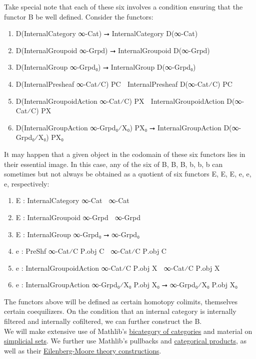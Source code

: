 \documentclass{book}
\theoremstyle{definition}
\begin{document}
Take special note that each of these six involves a condition ensuring that the functor B⃗ be well defined. Consider the functors:

\begin{enumerate}
\item D(InternalCategory ∞-Cat) ⭢ InternalCategory D(∞-Cat)
\item D(InternalGroupoid ∞-Grpd) ⭢ InternalGroupoid D(∞-Grpd)
\item D(InternalGroup ∞-Grpd₀) ⭢ InternalGroup D(∞-Grpd₀)
\item D(InternalPresheaf ∞-Cat⁄C) P⃗C ⭢ InternalPresheaf D(∞-Cat⁄C) P⃗C
\item D(InternalGroupoidAction ∞-Cat⁄C) P⃡X ⭢ InternalGroupoidAction D(∞-Cat⁄C) P⃡X
\item D(InternalGroupAction ∞-Grpd₀⁄X₀) PX₀ ⭢ InternalGroupAction D(∞-Grpd₀⁄X₀) PX₀
\end{enumerate}

It may happen that a given object in the codomain of these six functors lies in their essential image. In this case, any of the six of B⃗, B⃡, B, b⃗, b⃡, b can sometimes but not always be obtained as a quotient of six functors E⃗, E⃡, E, e⃗, e⃡, e, respectively:

\begin{enumerate}
\item E⃗ : InternalCategory ∞-Cat ⭢ ∞-Cat
\item E⃡ : InternalGroupoid ∞-Grpd ⭢ ∞-Grpd
\item E : InternalGroup ∞-Grpd₀ ⭢ ∞-Grpd₀
\item e⃗ : PreShf ∞-Cat⁄C P⃗.obj C ⭢ ∞-Cat⁄C P⃗.obj C
\item e⃡ : InternalGroupoidAction ∞-Cat⁄C P⃡.obj X ⭢ ∞-Cat⁄C P⃡.obj X
\item e : InternalGroupAction ∞-Grpd₀⁄X₀ P.obj X₀ ⭢ ∞-Grpd₀⁄X₀ P.obj X₀
\end{enumerate}

The functors above will be defined as certain homotopy colimits, themselves certain coequilizers. On the condition that an internal category is internally filtered and internally cofiltered, we can further construct the B⃗.\\

We will make extensive use of Mathlib's \href{https://leanprover-community.github.io/mathlib4_docs/Mathlib/CategoryTheory/Category/Cat.html#CategoryTheory.Cat.bicategory}{bicategory of categories} and material on \href{https://github.com/leanprover-community/mathlib4/blob/bd3e369b6f82c874de0f318c71d7e0595f8a3aa4//Mathlib/AlgebraicTopology/SimplicialSet.lean#L47-L48}{simplicial sets}. We further use Mathlib's pullbacks and \href{https://github.com/leanprover-community/mathlib4/blob/bd3e369b6f82c874de0f318c71d7e0595f8a3aa4/Mathlib/CategoryTheory/Products/Basic.lean}{categorical products}, as well as their \href{https://github.com/leanprover-community/mathlib4/blob/bd3e369b6f82c874de0f318c71d7e0595f8a3aa4/Mathlib/CategoryTheory/Monad/Algebra.lean}{Eilenberg-Moore theory constructions}.\\
\end{document}
